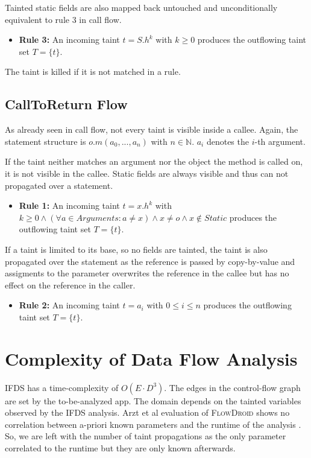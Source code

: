 \documentclass[../draft.tex]{subfiles}
\begin{document}
    Tainted static fields are also mapped back untouched and unconditionally equivalent to rule 3 in call flow.
    \begin{itemize}
        \item[] \textbf{Rule 3:} An incoming taint $t = S.h^k$ with $k \geq 0$ produces the outflowing taint set $T = \{t\}$. 
    \end{itemize}

    The taint is killed if it is not matched in a rule.
    \subsection{CallToReturn Flow}
    As already seen in call flow, not every taint is visible inside a callee. 
    Again, the statement structure is $o.m(a_0, ..., a_n)$ with $n \in \mathbb{N}$. $a_i$ denotes the $i$-th argument.

    If the taint neither matches an argument nor the object the method is called on, it is not visible in the callee. Static fields are always visible and thus can not propagated over a statement.
    \begin{itemize}
        \item[] \textbf{Rule 1:} An incoming taint $t = x.h^k$ with $k \geq 0 \land (\forall a \in \mathit{Arguments}: a \neq x) \land x \neq o \land x \notin \mathit{Static}$ produces the outflowing taint set $T = \{t\}$. 
    \end{itemize}

    If a taint is limited to its base, so no fields are tainted, the taint is also propagated over the statement as the reference is passed by copy-by-value and assigments to the parameter overwrites the reference in the callee but has no effect on the reference in the caller.
    \begin{itemize}
        \item[] \textbf{Rule 2:} An incoming taint $t = a_i$ with $0 \leq i \leq n$ produces the outflowing taint set $T = \{t\}$. 
    \end{itemize}
        

    \section{Complexity of Data Flow Analysis}\label{s:complexity}
    IFDS has a time-complexity of $O(E \cdot D^3)$. The edges in the control-flow graph are set by the to-be-analyzed app. The domain depends on the tainted variables observed by the IFDS analysis. Arzt et al evaluation of \textsc{FlowDroid} shows no correlation between a-priori known parameters and the runtime of the analysis \cite{Arzt2017PhD}. So, we are left with the number of taint propagations as the only parameter correlated to the runtime but they are only known afterwards. 
\end{document}
